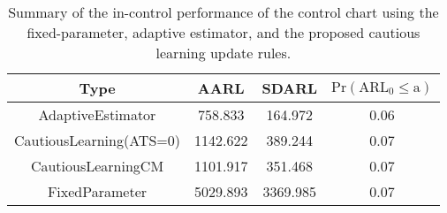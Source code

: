 \begin{table}[!h]

\caption{Summary of the in-control performance of the control chart using the fixed-parameter, adaptive estimator, and the proposed cautious learning update rules.}
\centering
\begin{tabular}[t]{cccc}
\toprule
Type & AARL & SDARL & $\text{Pr}(\text{ARL}_0 \leq \text{a})$\\
\midrule
AdaptiveEstimator & 758.833 & 164.972 & 0.06\\
CautiousLearning(ATS=0) & 1142.622 & 389.244 & 0.07\\
CautiousLearningCM & 1101.917 & 351.468 & 0.07\\
FixedParameter & 5029.893 & 3369.985 & 0.07\\
\bottomrule
\end{tabular}
\end{table}

